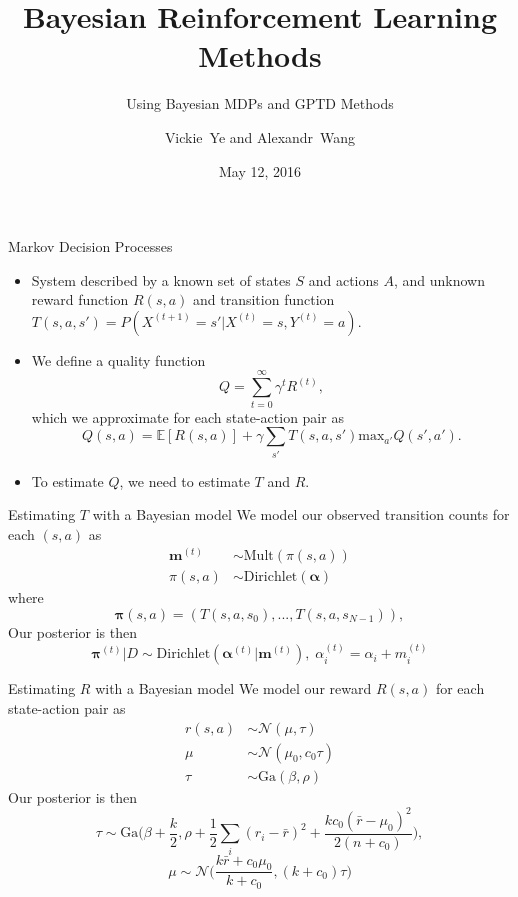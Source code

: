 \documentclass{beamer}
\title { Bayesian Reinforcement Learning Methods }
\subtitle { Using Bayesian MDPs and GPTD Methods }
\author[Vickie Ye and Alexandr Wang]
{ Vickie~Ye and Alexandr~Wang}
\date[Spring 2016]
{ May 12, 2016}
\begin{document}
\begin{frame}
\titlepage
\end{frame}

\begin{frame}{Markov Decision Processes}

\begin{itemize}
\item System described by a known set of states $S$ and actions $A$,
and unknown reward function $R(s, a)$ and transition function
$T(s, a, s') = P(X^{(t+1)} = s' | X^{(t)} = s, Y^{(t)} = a)$.
\item We define a quality function
\begin{equation}
Q = \sum_{t=0}^\infty \gamma^t R^{(t)},
\end{equation}
which we approximate for each state-action pair as
\begin{equation}
Q(s, a) = \mathbb{E}[R(s,a)]+\gamma\sum_{s'}T(s, a, s')
\textrm{max}_{a'} Q(s',a').
\end{equation}
\item To estimate $Q$, we need to estimate $T$ and $R$.
\end{itemize}
\end{frame}

\begin{frame}{Estimating $T$ with a Bayesian model \cite{strens}}
We model our observed transition counts for each $(s, a)$ as
\begin{align*}
\mathbf{m}^{(t)} &\sim \textrm{Mult}(\pi(s, a))\\
\pi(s, a) &\sim \textrm{Dirichlet}(\mathbf{\alpha})
\end{align*}
where 
\begin{equation*}
\mathbf{\pi}(s, a) = (T(s, a, s_0), ..., T(s, a, s_{N-1})),
\end{equation*}
Our posterior is then 
\begin{equation}
\mathbf{\pi}^{(t)}| D \sim \textrm{Dirichlet}(\mathbf{\alpha}^{(t)}|
\mathbf{m}^{(t)}), \;
\alpha^{(t)}_i = \alpha_i + m_i^{(t)}
\end{equation}
\end{frame}

\begin{frame}{Estimating $R$ with a Bayesian model \cite{strens}}
We model our reward $R(s, a)$ for each state-action pair as
\begin{align*}
r(s, a) &\sim \mathcal{N}(\mu, \tau) \\
\mu &\sim \mathcal{N}(\mu_0, c_0\tau) \\
\tau &\sim \textrm{Ga}(\beta, \rho)
\end{align*}
Our posterior is then
\begin{equation}
\tau \sim \textrm{Ga}\Big(\beta + \frac{k}{2}, \rho + \frac{1}{2}\sum_i(r_i - \bar{r})^2
+ \frac{kc_0(\bar{r}-\mu_0)^2}{2(n+c_0)}\Big),
\end{equation}
\begin{equation}
\mu \sim \mathcal{N}\Big(\frac{k\bar{r} + c_0\mu_0}{k + c_0}, (k+c_0)\tau\Big)
\end{equation}
\end{frame}
\end{document}
